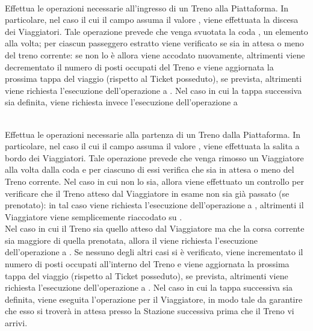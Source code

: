 \begin{description}
		\item {}\\
		Effettua le operazioni necessarie all'ingresso di un Treno alla Piattaforma. In particolare, nel caso il cui il campo  assuma il valore , viene effettuata la discesa dei Viaggiatori. Tale operazione prevede che venga svuotata la coda , un elemento alla volta; per ciascun passeggero estratto viene verificato se sia in attesa o meno del treno corrente: se non lo è allora viene accodato nuovamente, altrimenti viene decrementato il numero di posti occupati del Treno e viene aggiornata la prossima tappa del viaggio (rispetto al Ticket posseduto), se prevista, altrimenti viene richiesta l'esecuzione dell'operazione  a . Nel caso in cui la tappa successiva sia definita, viene richiesta invece l'esecuzione dell'operazione  a 
		
		\item {}\\
		Effettua le operazioni necessarie alla partenza di un Treno dalla Piattaforma. In particolare, nel caso il cui il campo  assuma il valore , viene effettuata la salita a bordo dei Viaggiatori. Tale operazione prevede che venga rimosso un Viaggiatore alla volta dalla coda  e per ciascuno di essi verifica che sia in attesa o meno del Treno corrente. Nel caso in cui non lo sia, allora viene effettuato un controllo per verificare che il Treno atteso dal Viaggiatore in esame non sia già passato (se prenotato): in tal caso viene richiesta l'esecuzione dell'operazione  a , altrimenti il Viaggiatore viene semplicemente riaccodato su . \\
		Nel caso in cui il Treno sia quello atteso dal Viaggiatore ma che la corsa corrente sia maggiore di quella prenotata, allora il  viene richiesta l'esecuzione dell'operazione  a . Se nessuno degli altri casi si è verificato, viene incrementato il numero di posti occupati all'interno del Treno e viene aggiornata la prossima tappa del viaggio (rispetto al Ticket posseduto), se prevista, altrimenti viene richiesta l'esecuzione dell'operazione  a . Nel caso in cui la tappa successiva sia definita, viene eseguita l'operazione  per il Viaggiatore, in modo tale da garantire che esso si troverà in attesa presso la Stazione successiva prima che il Treno vi arrivi.
		
	\end{description}
	
